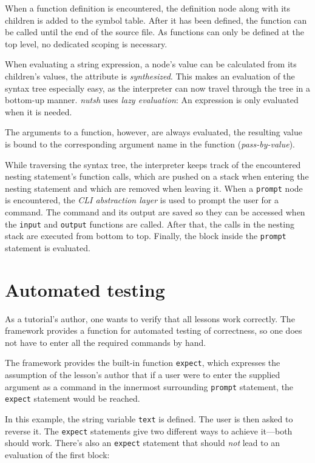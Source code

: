 \documentclass[paper=a4,twoside,abstract=on,cleardoublepage=empty,numbers=noenddot,toc=bib,toc=listof,12pt,appendixprefix=true]{scrreprt}
\begin{document}
When a function definition is encountered, the definition node along with its children is added to the symbol table. After it has been defined, the function can be called until the end of the source file. As functions can only be defined at the top level, no dedicated scoping is necessary.

When evaluating a string expression, a node's value can be calculated from its children's values, the attribute is \emph{synthesized}. This makes an evaluation of the syntax tree especially easy, as the interpreter can now travel through the tree in a bottom-up manner. \emph{nutsh} uses \emph{lazy evaluation}: An expression is only evaluated when it is needed.

The arguments to a function, however, are always evaluated, the resulting value is bound to the corresponding argument name in the function (\emph{pass-by-value}).

While traversing the syntax tree, the interpreter keeps track of the encountered nesting statement's function calls, which are pushed on a stack when entering the nesting statement and which are removed when leaving it. When a \texttt{prompt} node is encountered, the \emph{CLI abstraction layer} is used to prompt the user for a command. The command and its output are saved so they can be accessed when the \texttt{input} and \texttt{output} functions are called. After that, the calls in the nesting stack are executed from bottom to top. Finally, the block inside the \texttt{prompt} statement is evaluated.

\section{Automated testing}
\label{sec:testing}

As a tutorial's author, one wants to verify that all lessons work correctly. The framework provides a function for automated testing of correctness, so one does not have to enter all the required commands by hand.

The framework provides the built-in function \texttt{expect}, which expresses the assumption of the lesson's author that if a user were to enter the supplied argument as a command in the innermost surrounding \texttt{prompt} statement, the \texttt{expect} statement would be reached.

In this example, the string variable \texttt{text} is defined. The user is then asked to reverse it. The \texttt{expect} statements give two different ways to achieve it---both should work. There's also an \texttt{expect} statement that should \emph{not} lead to an evaluation of the first block:
\end{document}
